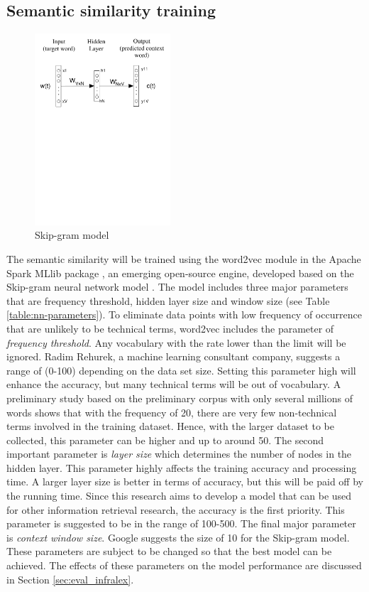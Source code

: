 \documentclass[Journal, InsideFigs, DoubleSpace]{ascelike} %
\begin{document}
\subsection{Semantic similarity training}
%
\begin{figure}[t]
	\centering
	\includegraphics[width=0.45\textwidth]{Figure4_skip-gram-model}
	\caption{Skip-gram model}
	\label{fig:skip-gram}
\end{figure}
%
The semantic similarity will be trained using the word2vec module in the Apache Spark MLlib package \cite{apache16}, an emerging open-source engine, developed based on the Skip-gram neural network model \cite{mikolov13a}. The model includes three major parameters that are frequency threshold, hidden layer size and window size (see Table \ref{table:nn-parameters}). To eliminate data points with low frequency of occurrence that are unlikely to be technical terms, word2vec includes the parameter of \textit{frequency threshold}. Any vocabulary with the rate lower than the limit will be ignored. Radim Rehurek, a machine learning consultant company, suggests a range of (0-100) depending on the data set size. Setting this parameter high will enhance the accuracy, but many technical terms will be out of vocabulary. A preliminary study based on the preliminary corpus with only several millions of words shows that with the frequency of 20, there are very few non-technical terms involved in the training dataset. Hence, with the larger dataset to be collected, this parameter can be higher and up to around 50. The second important parameter is \textit{layer size} which determines the number of nodes in the hidden layer. This parameter highly affects the training accuracy and processing time. A larger layer size is better in terms of accuracy, but this will be paid off by the running time. Since this research aims to develop a model that can be used for other information retrieval research, the accuracy is the first priority. This parameter is suggested to be in the range of 100-500. The final major parameter is \textit{context window size}. Google suggests the size of 10 for the Skip-gram model. These parameters are subject to be changed so that the best model can be achieved. The effects of these parameters on the model performance are discussed in Section \ref{sec:eval_infralex}.
\end{document}
